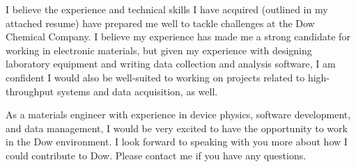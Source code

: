 \documentclass[11pt,a4paper,roman]{moderncv}        %
\begin{document}
I believe the experience and technical skills I have acquired (outlined in my attached resume) have prepared me well to tackle challenges at the Dow Chemical Company.  I believe my experience has made me a strong candidate for working in electronic materials, but given my experience with designing laboratory equipment and writing data collection and analysis software, I am confident I would also be well-suited to working on projects related to high-throughput systems and data acquisition, as well.

As a materials engineer with experience in device physics, software development, and data management, I would be very excited to have the opportunity to work in the Dow environment.  I look forward to speaking with you more about how I could contribute to Dow.  Please contact me if you have any questions.



\makeletterclosing
\end{document}
